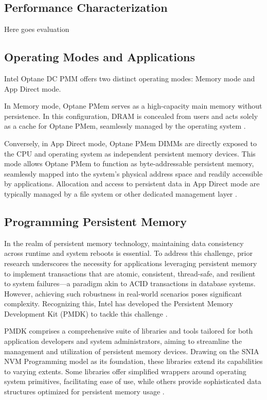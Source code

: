 \subsection{Performance Characterization}
Here goes evaluation

\subsection{Operating Modes and Applications}

Intel Optane DC PMM offers two distinct operating modes: Memory mode and App Direct mode.

In Memory mode, Optane PMem serves as a high-capacity main memory without persistence. In this configuration, DRAM is concealed from users and acts solely as a cache for Optane PMem, seamlessly managed by the operating system \cite{yang2020empirical}.

Conversely, in App Direct mode, Optane PMem DIMMs are directly exposed to the CPU and operating system as independent persistent memory devices. This mode allows Optane PMem to function as byte-addressable persistent memory, seamlessly mapped into the system's physical address space and readily accessible by applications. Allocation and access to persistent data in App Direct mode are typically managed by a file system or other dedicated management layer \cite{yang2020empirical,WhyIsthe9:online}.

\subsection{Programming Persistent Memory}

In the realm of persistent memory technology, maintaining data consistency across runtime and system reboots is essential. To address this challenge, prior research underscores the necessity for applications leveraging persistent memory to implement transactions that are atomic, consistent, thread-safe, and resilient to system failures—a paradigm akin to ACID transactions in database systems. However, achieving such robustness in real-world scenarios poses significant complexity. Recognizing this, Intel has developed the Persistent Memory Development Kit (PMDK) to tackle this challenge \cite{scargall2020pmem,rudoff2017persistent}.

PMDK comprises a comprehensive suite of libraries and tools tailored for both application developers and system administrators, aiming to streamline the management and utilization of persistent memory devices. Drawing on the SNIA NVM Programming model \cite{NVMProgr73:online} as its foundation, these libraries extend its capabilities to varying extents. Some libraries offer simplified wrappers around operating system primitives, facilitating ease of use, while others provide sophisticated data structures optimized for persistent memory usage \cite{scargall2020pmem}.

